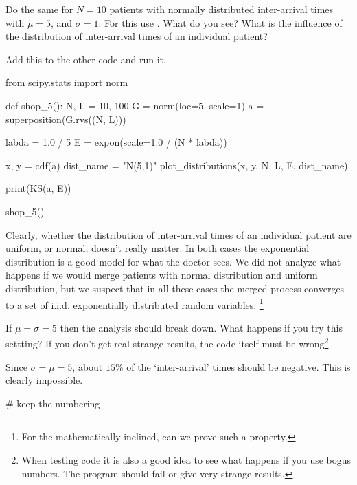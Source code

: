 \begin{exercise}
Do the same for $N=10$ patients with normally distributed inter-arrival times with $\mu=5$, and $\sigma =1$.
For this use . What do you see? What is the influence of the distribution of inter-arrival times of an individual patient?
\begin{solution}
Add this to the other code and run it.
\begin{pyverbatim}
from scipy.stats import norm


def shop_5():
    N, L = 10, 100
    G = norm(loc=5, scale=1)
    a = superposition(G.rvs((N, L)))

    labda = 1.0 / 5
    E = expon(scale=1.0 / (N * labda))

    x, y = cdf(a)
    dist_name = "N(5,1)"
    plot_distributions(x, y, N, L, E, dist_name)

    print(KS(a, E))


shop_5()
\end{pyverbatim}

Clearly, whether the distribution of inter-arrival times of an individual patient are uniform, or normal, doesn't really matter.
In both cases the exponential distribution is a good model for what the doctor sees.
We did not analyze what happens if we would merge patients with normal distribution and uniform distribution, but we suspect that in all these cases the merged process converges to a set of i.i.d.
exponentially distributed random variables.
\footnote{For the mathematically inclined, can we prove such a property.}

\end{solution}
\end{exercise}

\begin{exercise}
  If $\mu=\sigma=5$ then the analysis should break down.
  What happens if you try this settting?
  If you don't get real strange results, the code itself must be wrong\footnote{When testing code it is also a good idea to see what happens if you use bogus numbers.
    The program should fail or give very strange results.}.
\begin{solution}
  Since $\sigma=\mu=5$, about $15\%$ of the `inter-arrival' times should be negative. This is clearly impossible.
\begin{pyverbatim}
# keep the numbering
\end{pyverbatim}
\end{solution}
\end{exercise}



